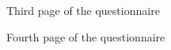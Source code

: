 \documentclass[12pt,oneside,openright,a4paper]{cpe-english-project}
\begin{document}
      \begin{figure}[!h]
        \centering
        \caption{Third page of the questionnaire}\label{fig:Survey_3}
      \end{figure}
      \begin{figure}[!h]
        \centering
        \caption{Fourth page of the questionnaire}\label{fig:Survey_4}
      \end{figure}
      \FloatBarrier
\end{document}
